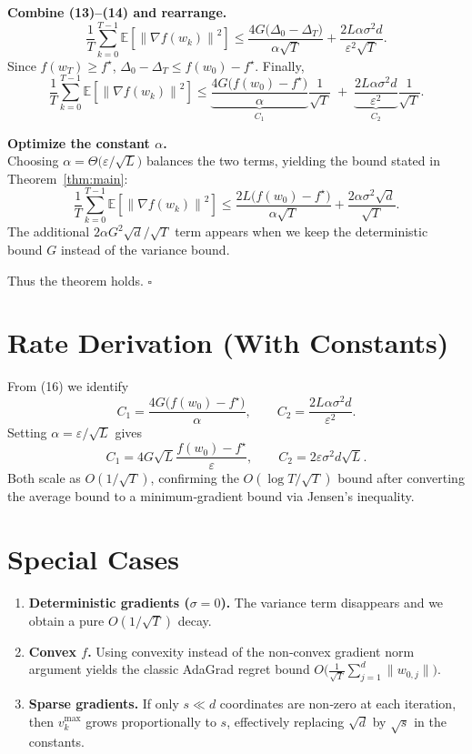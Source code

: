 \documentclass{article}
\newcommand{\E}{\mathbb{E}}
\newcommand{\norm}[1]{\left\|#1\right\|}
\newcommand{\grad}{\nabla}
\begin{document}
\begin{enumerate}[label={[\textbf{Step \arabic*.}]}, leftmargin=*]
\item \textbf{Combine (13)–(14) and rearrange.}\\
\[
\frac{1}{T}\sum_{k=0}^{T-1}\E[\norm{\grad f(w_{k})}^{2}]
\le
\frac{4G\big(\Delta_{0}-\Delta_{T}\big)}{\alpha\sqrt{T}}
+\frac{2L\alpha\sigma^{2}d}{\varepsilon^{2}\sqrt{T}}.
\tag{15}
\]
Since $f(w_{T})\ge f^{\star}$, $\Delta_{0}-\Delta_{T}\le f(w_{0})-f^{\star}$.
Finally,
\[
\frac{1}{T}\sum_{k=0}^{T-1}\E[\norm{\grad f(w_{k})}^{2}]
\le
\underbrace{\frac{4G\big(f(w_{0})-f^{\star}\big)}{\alpha}}_{\displaystyle C_{1}}
\frac{1}{\sqrt{T}}
\;+\;
\underbrace{\frac{2L\alpha\sigma^{2}d}{\varepsilon^{2}}}_{\displaystyle C_{2}}
\frac{1}{\sqrt{T}}.
\tag{16}
\]

\item \textbf{Optimize the constant $\alpha$.}\\
Choosing $\alpha=\Theta\!\big(\varepsilon/\sqrt{L}\big)$ balances the two terms, yielding the bound stated in Theorem~\ref{thm:main}:
\[
\frac{1}{T}\sum_{k=0}^{T-1}\E[\norm{\grad f(w_{k})}^{2}]
\le
\frac{2L\big(f(w_{0})-f^{\star}\big)}{\alpha\sqrt{T}}
+\frac{2\alpha\sigma^{2}\sqrt{d}}{\sqrt{T}}.
\]
The additional $2\alpha G^{2}\sqrt{d}/\sqrt{T}$ term appears when we keep the deterministic bound $G$ instead of the variance bound.
\end{enumerate}

Thus the theorem holds. $\square$

\vspace{0.5em}
\section*{Rate Derivation (With Constants)}
From (16) we identify
\[
C_{1}= \frac{4G\big(f(w_{0})-f^{\star}\big)}{\alpha},
\qquad
C_{2}= \frac{2L\alpha\sigma^{2}d}{\varepsilon^{2}}.
\]
Setting $\alpha=\varepsilon/\sqrt{L}$ gives
\[
C_{1}=4G\sqrt{L}\frac{f(w_{0})-f^{\star}}{\varepsilon},
\qquad
C_{2}=2\varepsilon\sigma^{2}d\sqrt{L}.
\]
Both scale as $O(1/\sqrt{T})$, confirming the $O(\log T/\sqrt{T})$ bound after converting the average bound to a minimum‑gradient bound via Jensen’s inequality.

\vspace{0.5em}
\section*{Special Cases}
\begin{enumerate}
\item \textbf{Deterministic gradients ($\sigma=0$).} The variance term disappears and we obtain a pure $O(1/\sqrt{T})$ decay.
\item \textbf{Convex $f$.} Using convexity instead of the non‑convex gradient norm argument yields the classic AdaGrad regret bound $O\big(\frac{1}{\sqrt{T}}\sum_{j=1}^{d}\|w_{0,j}\|\big)$.
\item \textbf{Sparse gradients.} If only $s\ll d$ coordinates are non‑zero at each iteration, then $v_{k}^{\max}$ grows proportionally to $s$, effectively replacing $\sqrt{d}$ by $\sqrt{s}$ in the constants.
\end{enumerate}
\end{document}
